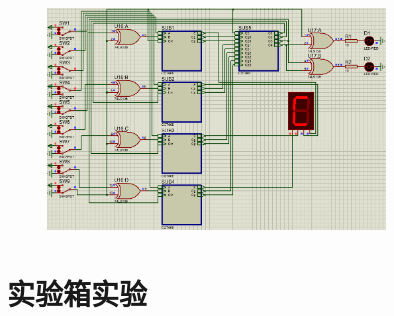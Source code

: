 \documentclass[UTF8, a4paper, 11pt]{article}
\begin{document}
\begin{figure}[H]
    \centering
    \includegraphics[width=0.8\textwidth]{8.png}
\end{figure}
\section{实验箱实验}
\end{document}
